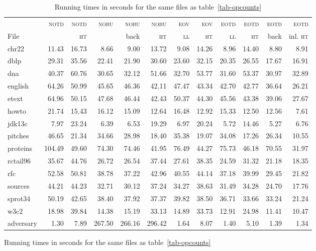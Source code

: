 \documentclass{llncs}
\newcommand\notd{\textsc{notd}\xspace}
\newcommand\nobu{\textsc{nobu}\xspace}
\newcommand\eotd{\textsc{eotd}\xspace}
\newcommand\eov{\textsc{eov}\xspace}
\newcommand\lili{\textsc{ll}\xspace}
\newcommand\hata{\textsc{ht}\xspace}
\begin{document}
\begin{figure}[t]
\begin{table}[t]
\begin{center}
    \scriptsize
     \addtolength{\tabcolsep}{.3ex}
    \begin{tabular}{lrrrrrrrrrrr}
		&             \notd	&	\notd&	\nobu&	\nobu&	\nobu&
                \eov  &	\eov &	\eotd&	\eotd &	\eotd&	\eotd\\
	File&	     &	\hata&	             &    back & \hata  &	\lili &	        \hata &	\lili&	         \hata&	 back&	     inl. \hata \\ \hline
	chr22&	11.43&	16.73&	8.66& 9.00 &	13.72&	9.08&	14.26&	8.96&	14.40&	8.80&	8.91 \\
	dblp&	29.31&	35.56&	22.41& 21.90 &	30.60&	23.60&	32.15&	20.35&	26.55&	17.67&	16.91 \\
	dna&	40.37&	60.76&	30.65& 32.12 &	51.66&	32.70&	53.77&	31.60&	53.37&	30.97&	32.89 \\
	english&	64.26&	50.99&	45.65& 46.36 &	42.11&	47.47&	43.34&	42.70&	42.77&	36.64&	26.21 \\
	etext&	64.96&	50.15&	47.68& 46.44 &	42.43&	50.37&	44.30&	45.56&	43.38&	39.06&	27.67 \\
	howto&	21.74&	15.43&	16.12& 15.09 &	12.64&	16.48&	12.92&	15.33&	12.50&	12.56&	7.61 \\
	jdk13c&	7.97&	23.24&	6.39& 6.53 &	19.29&	6.97&	20.24&	5.72&	14.46&	5.27&	6.76 \\
	pitches&	46.65&	21.34&	34.66& 28.98 &	18.40&	35.38&	19.07&	34.08&	17.26&	26.34&	10.55 \\
	proteins&	104.49&	49.60&	74.30& 74.46 &	41.95&	76.49&	44.27&	75.73&	46.18&	70.55&	31.97 \\
	rctail96&	35.67&	44.76&	26.72& 26.54 &	37.44&	27.61&	38.35&	24.59&	31.32&	21.18&	18.35 \\
	rfc&	52.58&	50.81&	38.78& 37.22 &	42.96&	40.55&	44.14&	37.18&	39.99&	29.45&	21.82 \\
	sources&	44.21&	44.23&	32.71& 30.12 &	37.24&	34.27&	38.63&	31.49&	34.28&	24.70&	17.76 \\
	sprot34&	50.19&	42.65&	38.40& 37.92 &	37.37&	39.82&	38.50&	36.71&	33.66&	33.24&	21.24 \\
	w3c2&	18.98&	39.84&	14.38& 15.19 &	33.13&	14.89&	33.73&	12.91&	24.98&	11.41&	10.47 \\
	adversary&	1.30&	7.89&	267.50&	266.16&	296.42&	1.64&	8.07&	1.40&	5.10&	1.39&	1.34 \\
    \end{tabular}
    \end{center}
    \caption{\label{tab-runtimes}Running times in seconds for the same files as
    table~\ref{tab-opcounts}}
      \vspace{-2mm}
\end{table}


\end{figure}
\end{document}
